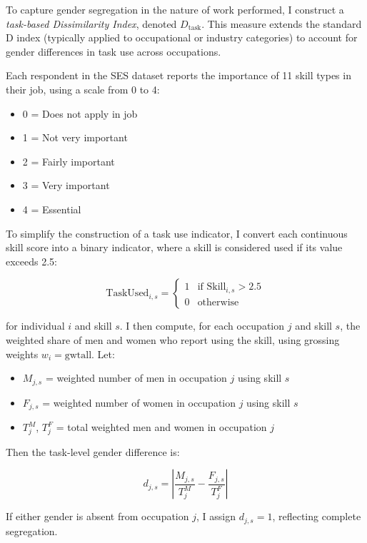 
To capture gender segregation in the nature of work performed, I construct a \textit{task-based Dissimilarity Index}, denoted $D_{\text{task}}$. This measure extends the standard D index (typically applied to occupational or industry categories) to account for gender differences in task use across occupations.

Each respondent in the SES dataset reports the importance of 11 skill types in their job, using a scale from 0 to 4:

\begin{itemize}
    \item 0 = Does not apply in job
    \item 1 = Not very important
    \item 2 = Fairly important
    \item 3 = Very important
    \item 4 = Essential
\end{itemize}

To simplify the construction of a task use indicator, I convert each continuous skill score into a binary indicator, where a skill is considered used if its value exceeds 2.5:

\[
\text{TaskUsed}_{i,s} =
\begin{cases}
1 & \text{if } \text{Skill}_{i,s} > 2.5 \\
0 & \text{otherwise}
\end{cases}
\]

for individual $i$ and skill $s$. I then compute, for each occupation $j$ and skill $s$, the weighted share of men and women who report using the skill, using grossing weights $w_i = \text{gwtall}$. Let:

\begin{itemize}
    \item $M_{j,s}$ = weighted number of men in occupation $j$ using skill $s$
    \item $F_{j,s}$ = weighted number of women in occupation $j$ using skill $s$
    \item $T^M_j$, $T^F_j$ = total weighted men and women in occupation $j$
\end{itemize}

Then the task-level gender difference is:

\[
d_{j,s} = \left| \frac{M_{j,s}}{T^M_j} - \frac{F_{j,s}}{T^F_j} \right|
\]

If either gender is absent from occupation $j$, I assign $d_{j,s} = 1$, reflecting complete segregation.

